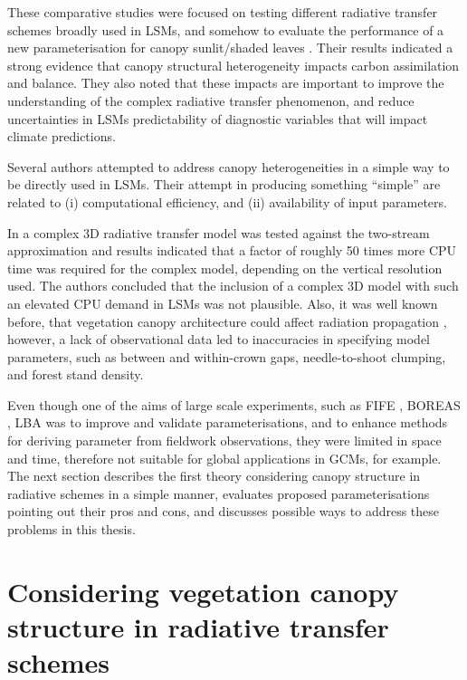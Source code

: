 These comparative studies were focused on testing different radiative transfer schemes broadly used in LSMs, and somehow to evaluate the performance of a new parameterisation for canopy sunlit/shaded leaves \citep{Mercado2007}. Their results indicated a strong evidence that canopy structural heterogeneity impacts carbon assimilation and balance. They also noted that these impacts are important to improve the understanding of the complex radiative transfer phenomenon, and reduce uncertainties in LSMs predictability of diagnostic variables that will impact climate predictions.

Several authors \citep{Nilson1971,Chen1997,Kucharik1999,pinty2006,Ni-Meister2010} attempted to address canopy heterogeneities in a simple way to be directly used in LSMs. Their attempt in producing something ``simple'' are related to (i) computational efficiency, and (ii) availability of input parameters.

In \citet{Yang2001} a complex 3D radiative transfer model was tested against the two-stream approximation and results indicated that a factor of roughly 50 times more CPU time was required for the complex model, depending on the vertical resolution used. The authors concluded that the inclusion of a complex 3D model with such an elevated CPU demand in LSMs was not plausible. Also, it was well known before, that vegetation canopy architecture could affect radiation propagation \citep{Nilson1971}, however, a lack of observational data led to inaccuracies in specifying model parameters, such as between and within-crown gaps, needle-to-shoot clumping, and forest stand density. 

Even though one of the aims of large scale experiments, such as FIFE \citep{Hall1995}, BOREAS \citep{Sellers1997}, LBA \citep{Keller2004} was to improve and validate parameterisations, and to enhance methods for deriving parameter from fieldwork observations, they were limited in space and time, therefore not suitable for global applications in GCMs, for example. 
The next section describes the first theory considering canopy structure in radiative schemes in a simple manner, evaluates proposed parameterisations pointing out their pros and cons, and discusses possible ways to address these problems in this thesis.

\section{Considering vegetation canopy structure in radiative transfer schemes}

